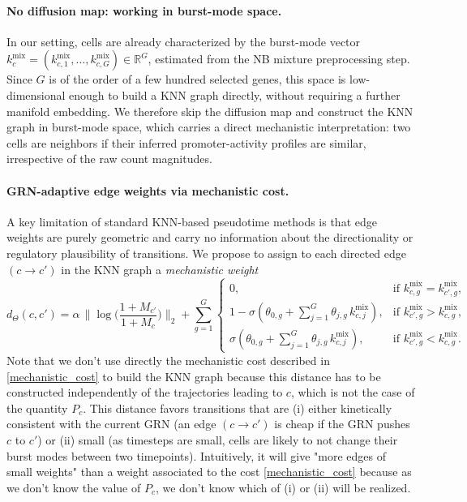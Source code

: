 \documentclass[10pt]{article}
\newcommand{\R}{\mathbb{R}}             %
\begin{document}
\paragraph{No diffusion map: working in burst-mode space.}
In our setting, cells are already characterized by the burst-mode vector
$k^{\mathrm{mix}}_c = (k^{\mathrm{mix}}_{c,1},\dots,k^{\mathrm{mix}}_{c,G}) \in \R^G$,
estimated from the NB mixture preprocessing step.  Since $G$ is of the order of a
few hundred selected genes, this space is low-dimensional enough to build a KNN graph
directly, without requiring a further manifold embedding.  We therefore skip the
diffusion map and construct the KNN graph in burst-mode space, which carries a direct
mechanistic interpretation: two cells are neighbors if their inferred
promoter-activity profiles are similar, irrespective of the raw count magnitudes.

\paragraph{GRN-adaptive edge weights via mechanistic cost.}
A key limitation of standard KNN-based pseudotime methods is that edge weights are
purely geometric and carry no information about the directionality or regulatory
plausibility of transitions.  We propose to assign to each directed edge $(c \to c')$
in the KNN graph a \emph{mechanistic weight}
\[
d_{\Theta}(c,c')
=
\alpha\,\bigl\|\log(\frac{1 + M_{c'}}{1 + M_c}\bigr)\|_2 +
\sum_{g=1}^G 
\begin{cases}
0,
& \text{if } k^{\mathrm{mix}}_{c,g} =  
k^{\mathrm{mix}}_{c',g},\\[0.3em]
1 - \sigma\!\left(\theta_{0,g} + \sum_{j=1}^G \theta_{j, g}\,k^{\mathrm{mix}}_{c,j}\right),
& \text{if } k^{\mathrm{mix}}_{c',g} > k^{\mathrm{mix}}_{c,g},\\[0.3em]
\sigma\!\left(\theta_{0,g} + \sum_{j=1}^G \theta_{j, g}\,k^{\mathrm{mix}}_{c,j}\right),
& \text{if } k^{\mathrm{mix}}_{c',g} < k^{\mathrm{mix}}_{c,g}.
\end{cases}
\]
Note that we don't use directly the mechanistic cost described in \eqref{mechanistic_cost} to build the KNN graph because this distance has to be constructed independently of the trajectories leading to $c$, which is not the case of the quantity $P_{c}$. This distance
favors transitions that are (i) either kinetically consistent with the current GRN (an edge
$(c \to c')$ is cheap if the GRN pushes $c$ to $c'$) or (ii) small (as timesteps are small, cells are likely to not change their burst modes between two timepoints). Intuitively, it will give "more edges of small weights" than a weight associated to the cost \eqref{mechanistic_cost} because as we don't know the value of $P_c$, we don't know which of (i) or (ii) will be realized.
\end{document}
